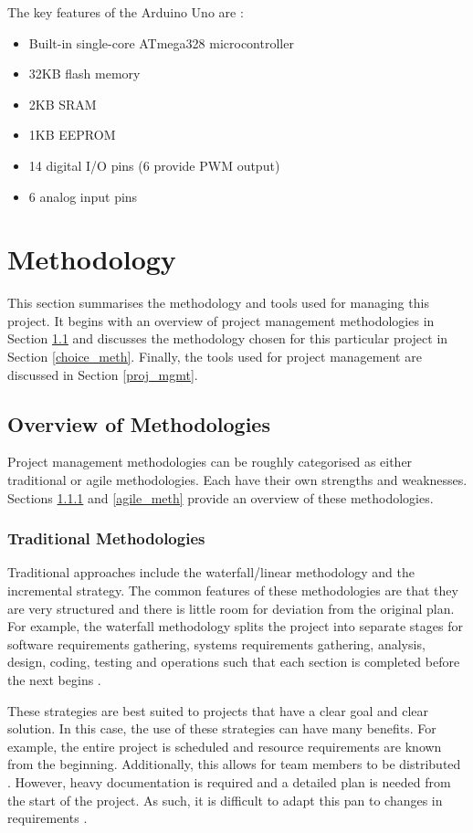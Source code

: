 \documentclass{UoYCSproject}
\begin{document}
The key features of the Arduino Uno are \parencite{arduinospec}:
\begin{itemize}
\item Built-in single-core ATmega328 microcontroller
\item 32KB flash memory
\item 2KB SRAM
\item 1KB EEPROM
\item 14 digital I/O pins (6 provide PWM output)
\item 6 analog input pins
\end{itemize}

\chapter{Methodology} \label{meth_chapt}
This section summarises the methodology and tools used for managing this project. It begins with an overview of project management methodologies in Section \ref{overview_meth} and discusses the methodology chosen for this particular project in Section \ref{choice_meth}. Finally, the tools used for project management are discussed in Section \ref{proj_mgmt}.

\section{Overview of Methodologies} \label{overview_meth}
Project management methodologies can be roughly categorised as either traditional or agile methodologies. Each have their own strengths and weaknesses. Sections \ref{trad_meth} and \ref{agile_meth} provide an overview of these methodologies.
\subsection{Traditional Methodologies} \label{trad_meth}
Traditional approaches include the waterfall/linear methodology and the incremental strategy. The common features of these methodologies are that they are very structured and there is little room for deviation from the original plan. For example, the waterfall methodology splits the project into separate stages for software requirements gathering, systems requirements gathering, analysis, design, coding, testing and operations such that each section is completed before the next begins \parencite{royce1987managing}.

These strategies are best suited to projects that have a clear goal and clear solution. In this case, the use of these strategies can have many benefits. For example, the entire project is scheduled and resource requirements are known from the beginning. Additionally, this allows for team members to be distributed \parencite{fernandez2008agile}. However, heavy documentation is required and a detailed plan is needed from the start of the project. As such, it is difficult to adapt this pan to changes in requirements \parencite{fernandez2008agile}.
\end{document}
